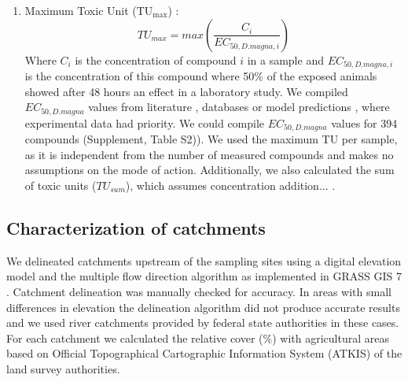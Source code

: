 \documentclass[journal=esthag,manuscript=article]{achemso}
\begin{document}
\begin{enumerate}
  \item Maximum Toxic Unit ($\mathrm{TU_{max}}$)  \citep{sprague_measurement_1970}: 
  \begin{equation}
  TU_{max} = max(\frac{C_i}{EC_{50, D.magna, i}})
  \end{equation}
%
%
  Where $C_i$ is the concentration of compound $i$ in a sample and $EC_{50, D.magna, i}$ is the concentration of this compound where 50\% of the exposed animals showed after 48 hours an effect in a laboratory study.
  We compiled $EC_{50, D.magna}$ values from literature \citep{malaj_organic_2014}, databases \citep{lewis_international_2016,u.s._epa_ecotoxicology_2015} or model predictions \citep{schuurmann_quantitative_2011}, where experimental data had priority.
%
%
  We could compile $EC_{50, D.magna}$ values for 394 compounds (Supplement, Table S2)).
%
%
  We used the maximum TU per sample, as it is independent from the number of measured compounds and makes no assumptions on the mode of action.
  Additionally, we also calculated the sum of toxic units ($TU_{sum}$), which assumes concentration addition... .
\end{enumerate}


\subsection{Characterization of catchments}
We delineated catchments upstream of the sampling sites using a digital elevation model \citep{eea_digital_2013} and the multiple flow direction algorithm \citep{holmgren_multiple_1994} as implemented in GRASS GIS 7 \citep{neteler_grass_2012}.
Catchment delineation was manually checked for accuracy. 
%
%
In areas with small differences in elevation the delineation algorithm did not produce accurate results and we used river catchments provided by federal state authorities in these cases.
%
%
For each catchment we calculated the relative cover (\%) with agricultural areas based on Official Topographical Cartographic Information System (ATKIS) of the land survey authorities.
%
%
\end{document}
